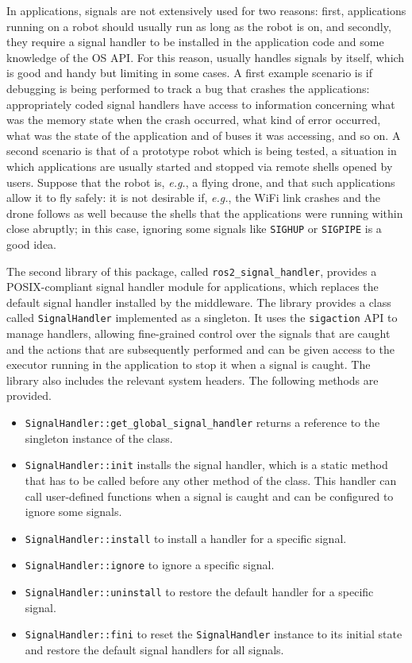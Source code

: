 In \ROS applications, signals are not extensively used for two reasons: first, applications running on a robot should usually run as long as the robot is on, and secondly, they require a signal handler to be installed in the application code and some knowledge of the OS API. For this reason, \ROS usually handles signals by itself, which is good and handy but limiting in some cases. A first example scenario is if debugging is being performed to track a bug that crashes the applications: appropriately coded signal handlers have access to information concerning what was the memory state when the crash occurred, what kind of error occurred, what was the state of the application and of buses it was accessing, and so on. A second scenario is that of a prototype robot which is being tested, a situation in which applications are usually started and stopped via remote shells opened by users. Suppose that the robot is, \emph{e.g.}, a flying drone, and that such applications allow it to fly safely: it is not desirable if, \emph{e.g.}, the WiFi link crashes and the drone follows as well because the shells that the applications were running within close abruptly; in this case, ignoring some signals like \texttt{SIGHUP} or \texttt{SIGPIPE} is a good idea.

The second library of this package, called \texttt{ros2\_signal\_handler}, provides a POSIX-compliant signal handler module for \ROS applications, which replaces the default signal handler installed by the \ROS middleware. The library provides a class called \texttt{SignalHandler} implemented as a singleton. It uses the \texttt{sigaction} API to manage handlers, allowing fine-grained control over the signals that are caught and the actions that are subsequently performed and can be given access to the executor running in the application to stop it when a signal is caught. The library also includes the relevant system headers. The following methods are provided.
\begin{itemize}
  \item \texttt{SignalHandler::get\_global\_signal\_handler} returns a reference to the singleton instance of the class.
  \item \texttt{SignalHandler::init} installs the signal handler, which is a static method that has to be called before any other method of the class. This handler can call user-defined functions when a signal is caught and can be configured to ignore some signals.
  \item \texttt{SignalHandler::install} to install a handler for a specific signal.
  \item \texttt{SignalHandler::ignore} to ignore a specific signal.
  \item \texttt{SignalHandler::uninstall} to restore the default handler for a specific signal.
  \item \texttt{SignalHandler::fini} to reset the \texttt{SignalHandler} instance to its initial state and restore the default signal handlers for all signals.
\end{itemize}

